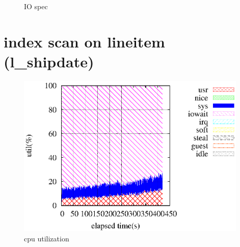 \documentclass[11pt,a4paper]{jsarticle}
\newlength{\subfigwidth}
\newlength{\subfigcolsep}
\begin{document}
\begin{figure}[thbp]
 \setlength{\subfigwidth}{.5\linewidth}
 \addtolength{\subfigwidth}{-.5\subfigcolsep}
 \begin{minipage}[b]{\subfigwidth}
 \end{minipage}
  \begin{minipage}[b]{\subfigwidth}
  \end{minipage}
  \caption{IO spec}
  \label{fig:clinesys}
\end{figure}

\section{index scan on lineitem (l\_shipdate)}
\begin{figure}[thbp]
 \begin{center}
  \includegraphics[width=110mm]{1_1core1.eps}
 \end{center}
 \caption{cpu utilization}
 \label{fig:1idxcpu}
\end{figure}
\end{document}
